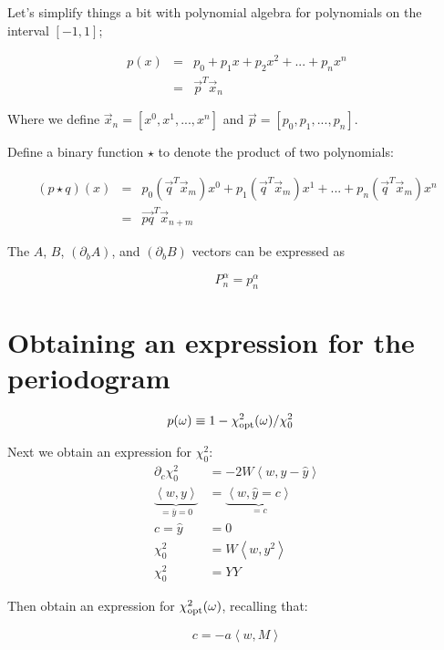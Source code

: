 \documentclass[notitlepage]{article}
\newcommand{\Ybar}{\bar{y}}
\newcommand{\YY}{YY}
\newcommand{\iprod}[2]{\left<#1, #2\right>}
\newcommand{\dA}{(\partial_b A)}
\newcommand{\dB}{(\partial_b B)}
\begin{document}
Let's simplify things a bit with polynomial algebra for polynomials on the interval $[-1, 1]$;

\begin{eqnarray}
p(x) &=& p_0 + p_1x + p_2x^2 + ... + p_nx^n\\
     &=& \vec{p}^T \vec{x}_n
\end{eqnarray}

Where we define $\vec{x}_n = [ x^0, x^1, ..., x^n ]$ and $\vec{p} = [ p_0, p_1, ..., p_n ]$.

Define a binary function $\star$ to denote the product of two polynomials:

\begin{eqnarray}
(p\star q)(x) &=& p_0\left(\vec{q}^T\vec{x}_m\right)x^0 + p_1\left(\vec{q}^T\vec{x}_m\right)x^1 + ... + p_n\left(\vec{q}^T\vec{x}_m\right)x^n\\
	          &=& \vec{pq}^T\vec{x}_{n+m}
\end{eqnarray}

The $A$, $B$, $\dA$, and $\dB$ vectors can be expressed as

\begin{equation}
P_n^{\alpha} = p_n^{\alpha}
\end{equation}

\section{Obtaining an expression for the periodogram}

\begin{align*}
p(\omega) &\equiv 1 - \chi^2_{\rm opt}(\omega) / \chi^2_0
\end{align*}

Next we obtain an expression for $\chi^2_0$:
\begin{align*}
\partial_c \chi^2_0 &= -2W\iprod{w}{y - \hat{y}}\\
	      \underbrace{\iprod{w}{y}}_{=\Ybar=0} &= \underbrace{\iprod{w}{\hat{y}=c}}_{=c}\\
	        c = \hat{y} &= 0\\
	        \chi^2_0 &= W\iprod{w}{y^2}\\
	        \chi^2_0 &= \YY
\end{align*}

Then obtain an expression for $\chi^2_{\rm opt}(\omega)$, recalling that:

\begin{equation}
c = -a\iprod{w}{M}
\end{equation}
\end{document}
